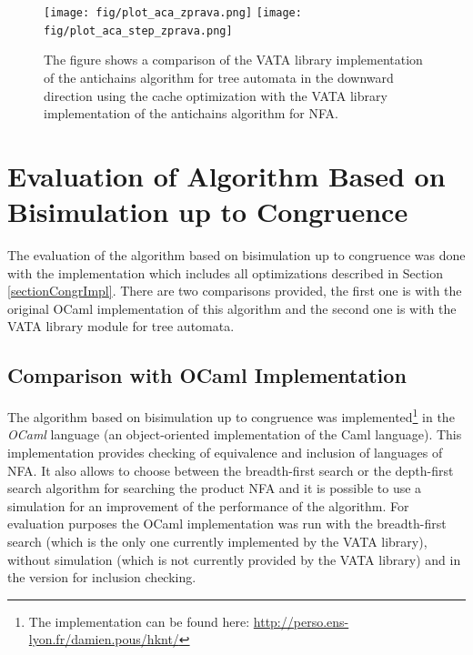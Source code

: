 \begin{figure}[bt]
\begin{center}
\texttt{[image: fig/plot\_aca\_zprava.png]}
\texttt{[image: fig/plot\_aca\_step\_zprava.png]}
\caption{The figure shows
 a comparison of the VATA library implementation of the antichains algorithm for tree automata in the downward direction using the cache optimization 
 with the VATA library implementation of the antichains algorithm for NFA.}
\label{fig:figPlotAca}
\end{center}
\end{figure}


\section{Evaluation of Algorithm Based on Bisimulation up to Congruence}
The evaluation of the algorithm based on bisimulation up to congruence was done with the implementation which includes all optimizations described in Section 
\ref{sectionCongrImpl}. There are two comparisons provided, the first one is with the original OCaml implementation of this algorithm \cite{popl13} 
and the second one is with the VATA library module for tree automata.

\subsection{Comparison with OCaml Implementation}
The algorithm based on bisimulation up to congruence was implemented\footnote{The implementation can be found here: \url{
http://perso.ens-lyon.fr/damien.pous/hknt/}} 
in the \emph{OCaml} language (an object-oriented implementation of the Caml language). 
This implementation provides checking of equivalence
and inclusion of languages of NFA. It also allows to choose between the breadth-first search or the depth-first search algorithm for searching the
pro\-duct NFA and it is possible to use a simulation for an improvement of the performance of the algorithm.
For evaluation purposes the OCaml implementation was run with the breadth-first search (which is the only one currently implemented by the VATA library), without
simulation (which is not currently provided by the VATA library) and in the version for inclusion checking.

